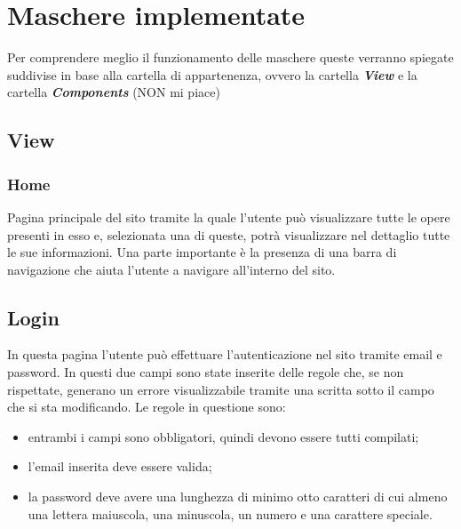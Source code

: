 \section{Maschere implementate}

Per comprendere meglio il funzionamento delle maschere queste verranno spiegate suddivise in base alla cartella di appartenenza, ovvero la cartella \textbf{\textit{View}} e la cartella \textbf{\textit{Components}} (NON mi piace)

\subsection{View}
\subsubsection{Home}
Pagina principale del sito tramite la quale l'utente può visualizzare tutte le opere presenti in esso e, selezionata una di queste, potrà visualizzare nel dettaglio tutte le sue informazioni. Una parte importante è la presenza di una barra di navigazione che aiuta l'utente a navigare all'interno del sito.
\subsection{Login}
In questa pagina l'utente può effettuare l'autenticazione nel sito tramite email e password. In questi due campi sono state inserite delle regole che, se non rispettate, generano un errore visualizzabile tramite una scritta sotto il campo che si sta modificando. Le regole in questione sono:
\begin{itemize}
	\item entrambi i campi sono obbligatori, quindi devono essere tutti compilati;
	\item l'email inserita deve essere valida;
	\item la password deve avere una lunghezza di minimo otto caratteri di cui almeno una lettera maiuscola, una minuscola, un numero e una carattere speciale.
\end{itemize}
